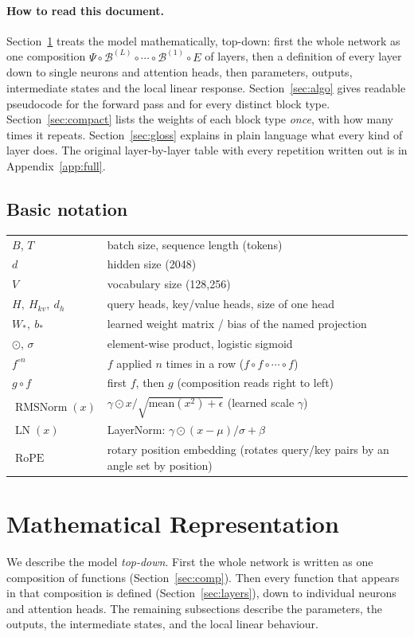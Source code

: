 \documentclass[10pt,a4paper]{article}
\newcommand{\op}[1]{\operatorname{#1}}
\theoremstyle{definition}
\begin{document}
\paragraph{How to read this document.} Section~\ref{sec:func} treats the model mathematically, top-down: first the whole network as one composition $\Psi\circ\mathcal{B}^{(L)}\circ\cdots\circ\mathcal{B}^{(1)}\circ E$ of layers, then a definition of every layer down to single neurons and attention heads, then parameters, outputs, intermediate states and the local linear response. Section~\ref{sec:algo} gives readable pseudocode for the forward pass and for every distinct block type. Section~\ref{sec:compact} lists the weights of each block type \emph{once}, with how many times it repeats. Section~\ref{sec:gloss} explains in plain language what every kind of layer does. The original layer-by-layer table with every repetition written out is in Appendix~\ref{app:full}.
\subsection*{Basic notation}
\begin{tabular}{ll}
\toprule
$B$, $T$ & batch size, sequence length (tokens) \\
$d$ & hidden size (2048) \\
$V$ & vocabulary size (128,256) \\
$H,\ H_{kv},\ d_h$ & query heads, key/value heads, size of one head \\
$W_\ast,\ b_\ast$ & learned weight matrix / bias of the named projection \\
$\odot$, $\sigma$ & element-wise product, logistic sigmoid \\
$f^{\circ n}$ & $f$ applied $n$ times in a row ($f\circ f\circ\cdots\circ f$) \\
$g \circ f$ & first $f$, then $g$ (composition reads right to left) \\
$\op{RMSNorm}(x)$ & $\gamma \odot x / \sqrt{\mathrm{mean}(x^2)+\epsilon}$ (learned scale $\gamma$) \\
$\op{LN}(x)$ & LayerNorm: $\gamma\odot(x-\mu)/\sigma + \beta$ \\
$\op{RoPE}$ & rotary position embedding (rotates query/key pairs by an angle set by position) \\
\bottomrule
\end{tabular}
\section{Mathematical Representation}\label{sec:func}
We describe the model \emph{top-down}. First the whole network is written as one composition of functions (Section~\ref{sec:comp}). Then every function that appears in that composition is defined (Section~\ref{sec:layers}), down to individual neurons and attention heads. The remaining subsections describe the parameters, the outputs, the intermediate states, and the local linear behaviour.
\end{document}
